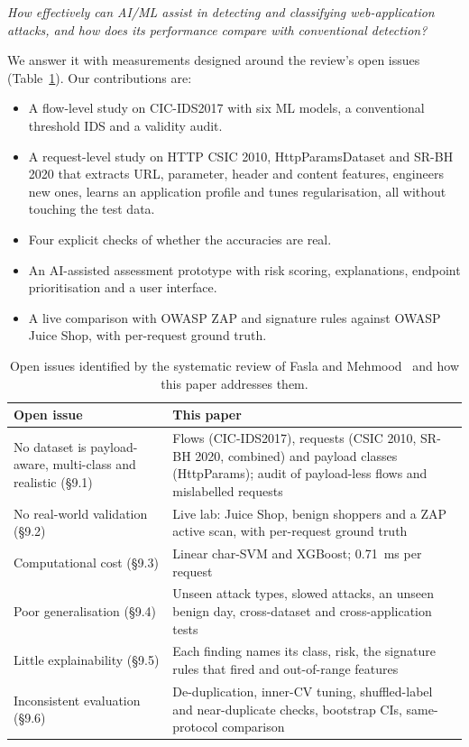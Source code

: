\documentclass[conference]{IEEEtran}
\begin{document}
\emph{How effectively can AI/ML assist in detecting and classifying web-application attacks, and how
does its performance compare with conventional detection?}

We answer it with measurements designed around the review's open issues (Table~\ref{tab:gaps}).
Our contributions are:

\begin{itemize}

    \item A flow-level study on CIC-IDS2017 with six ML models, a conventional threshold IDS and a validity audit.
    
    \item A request-level study on HTTP CSIC 2010, HttpParamsDataset and SR-BH 2020 that extracts URL, parameter, header and content features, engineers new ones, learns an application profile and tunes regularisation, all without touching the test data.
    
    \item Four explicit checks of whether the accuracies are real.
    
    \item An AI-assisted assessment prototype with risk scoring, explanations, endpoint prioritisation and a user interface.
    
    \item A live comparison with OWASP ZAP and signature rules against OWASP Juice Shop, with per-request ground truth.
    
\end{itemize}

\begin{table}[t]
\centering
\caption{Open issues identified by the systematic review of Fasla and Mehmood~\cite{fasla2026}
and how this paper addresses them.}
\label{tab:gaps}
\setlength{\tabcolsep}{3pt}\renewcommand{\arraystretch}{1.1}
\footnotesize
\begin{tabular}{@{}p{}p{}@{}}
\toprule
Open issue~\cite{fasla2026} & This paper \\
\midrule
No dataset is payload-aware, multi-class and realistic (\S9.1) &
Flows (CIC-IDS2017), requests (CSIC 2010, SR-BH 2020, combined) and payload classes
(HttpParams); audit of payload-less flows and mislabelled requests \\
No real-world validation (\S9.2) &
Live lab: Juice Shop, benign shoppers and a ZAP active scan, with per-request ground truth \\
Computational cost (\S9.3) &
Linear char-SVM and XGBoost; 0.71~ms per request \\
Poor generalisation (\S9.4) &
Unseen attack types, slowed attacks, an unseen benign day, cross-dataset and cross-application tests \\
Little explainability (\S9.5) &
Each finding names its class, risk, the signature rules that fired and out-of-range features \\
Inconsistent evaluation (\S9.6) &
De-duplication, inner-CV tuning, shuffled-label and near-duplicate checks, bootstrap CIs,
same-protocol comparison \\
\bottomrule
\end{tabular}
\end{table}
\end{document}
